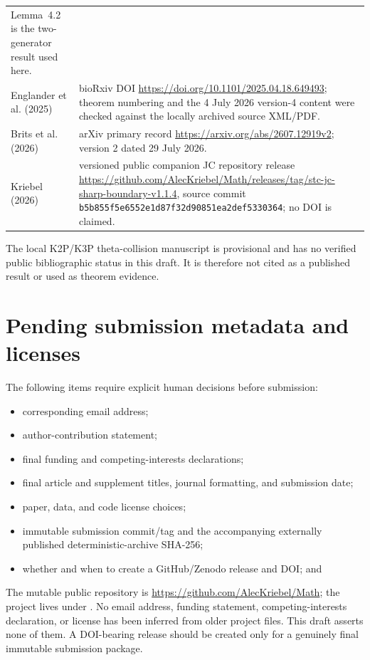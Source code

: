 \documentclass[11pt]{article}
\theoremstyle{remark}
\begin{document}
\begin{center}
\begin{tabular}{L{.27\linewidth}L{.63\linewidth}}
Lemma~4.2 is the two-generator result used here.\\
Englander et al. (2025) \cite{EnglanderEtAl2026}
& bioRxiv DOI \url{https://doi.org/10.1101/2025.04.18.649493}; theorem
numbering and the 4 July 2026 version-4 content were checked against the
locally archived source XML/PDF.\\
Brits et al. (2026) \cite{BritsEtAl2026}
& arXiv primary record \url{https://arxiv.org/abs/2607.12919v2}; version 2
dated 29 July 2026.\\
Kriebel (2026) \cite{KriebelJC2026}
& versioned public companion JC repository release
\url{https://github.com/AlecKriebel/Math/releases/tag/stc-jc-sharp-boundary-v1.1.4},
source commit \texttt{b5b855f5e6552e1d87f32d90851ea2def5330364}; no DOI is claimed.\\
\bottomrule
\end{tabular}
\end{center}

The local K2P/K3P theta-collision manuscript is provisional and has no
verified public bibliographic status in this draft.  It is therefore not
cited as a published result or used as theorem evidence.

\section{Pending submission metadata and licenses}\label{sec:pending}

The following items require explicit human decisions before submission:
\begin{itemize}
  \item corresponding email address;
  \item author-contribution statement;
  \item final funding and competing-interests declarations;
  \item final article and supplement titles, journal formatting, and submission
        date;
  \item paper, data, and code license choices;
  \item immutable submission commit/tag and the accompanying externally
        published deterministic-archive SHA-256;
  \item whether and when to create a GitHub/Zenodo release and DOI; and
\end{itemize}

The mutable public repository is
\url{https://github.com/AlecKriebel/Math}; the project lives under
.  No email address, funding
statement, competing-interests declaration, or license has been inferred from
older project files.  This draft asserts none of them.  A DOI-bearing release
should be created only for a genuinely final immutable submission package.
\end{document}

